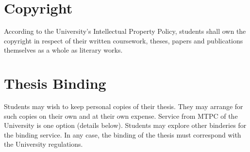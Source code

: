 \section{Copyright}
According to the University’s Intellectual Property Policy, students shall own the copyright in respect of their written coursework, theses, papers and publications themselves as a whole as literary works.

\section{Thesis Binding}
Students may wish to keep personal copies of their thesis. They may arrange for such copies on their own and at their own expense. Service from MTPC of the University is one option (details below). Students may explore other binderies for the binding service. In any case, the binding of the thesis must correspond with the University regulations.
